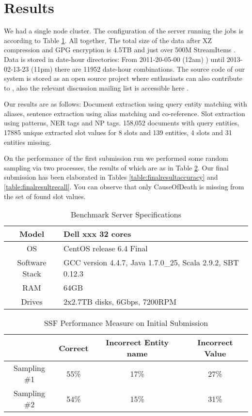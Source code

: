 
\section{Results}

 We had a single node cluster. The configuration of the server running the jobs is according to Table \ref{table:serverspec}. All together, The total size of the data after XZ compression and GPG encryption is 4.5TB and just over 500M StreamItems \cite{s3}. Data is stored in date-hour directories: From 2011-20-05-00 (12am) ) until 2013-02-13-23 (11pm) there are 11952 date-hour combinations. The source code of our system is stored as an open source project where enthusiasts can also contribute to \cite{github}, also the relevant discussion mailing list is accessible here \cite{googlegroups}.
 
 
 
 Our results are as follows: Document extraction using query entity matching with aliases, sentence 
extraction using alias matching and co-reference. Slot extraction using 
patterns, NER tags and NP tags. 158,052 documents with query entities, 17885 
unique extracted slot values for 8 slots and 139 entities, 4 slots and 31 
entities missing.

On the performance of the first submission run we performed some random 
sampling via two processes, the results of which are as in Table \ref{table:initialresult}. Our final submission has been elaborated in Tables \ref{table:finalresultaccuracy} and \ref{table:finalresultrecall}. You can observe that only CauseOfDeath is missing from the set of found slot values. 

\begin{table}[b]
\caption{Benchmark Server Specifications }
\centering
\label{table:serverspec}
\begin{tabular}{|c|l|}
\hline 
Model & Dell xxx 32 cores \\ \hline 
OS & CentOS release 6.4 Final \\ \hline 
Software Stack & GCC version 4.4.7, Java 1.7.0\_25, Scala 2.9.2, SBT 0.12.3 \\ \hline 
 RAM & 64GB\\ \hline 
 Drives & 2x2.7TB disks, 6Gbps, 7200RPM\\ \hline 
\end{tabular} 
\end{table}

\begin{table}[t]
\caption{SSF Performance Measure on Initial Submission }
\centering
\label{table:initialresult}

\begin{tabular}{|c|c|c|c|}
\hline 
 & Correct & Incorrect Entity name & Incorrect Value \\ 
\hline 
Sampling \#1 & 55\% & 17\% & 27\% \\ 
\hline Sampling \#2 & 54\% & 15\% & 31\%  \\ 
\hline 
\end{tabular} 
\end{table}


